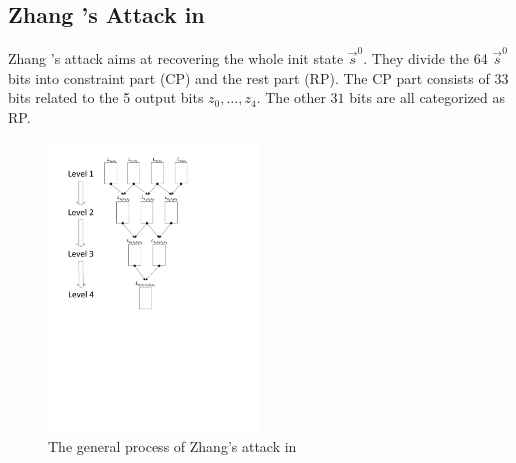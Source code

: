 \subsection{Zhang \etal's Attack in \cite{AC:Zhang19}}\label{sec:BriefReviewZhangAttack}
Zhang \etal's attack aims at recovering the whole init state $\vec{s}^0$.
They divide the 64 $\vec{s}^0$ bits into constraint part (CP) and the rest part (RP).
The CP part consists of 33 bits related to the 5 output bits $z_0,\ldots, z_4$.
The other $31$ bits are all categorized as RP.

\begin{figure}[htbp]
  \centering
  \includegraphics[width=0.5\textwidth]{pic/MergeZhang.pdf}
  \caption{The general process of Zhang's attack in \cite{AC:Zhang19}}\label{fig:MergeZhang}
\end{figure}

